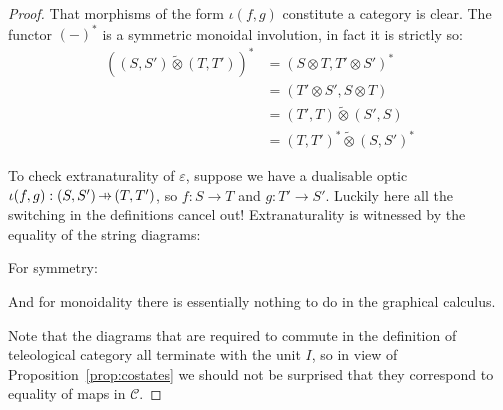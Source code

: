 \documentclass[11pt,letterpaper]{article}
\theoremstyle{plain}
\theoremstyle{definition}
\newcommand{\C}{\mathscr{C}}
\newcommand{\switched}{\mathbin{\tilde{\otimes}}}
\newcommand{\hto}{\ensuremath{\,\mathaccent\shortmid\rightarrow\,}}
\newcommand{\todo}[1]{\textcolor{red}{\small #1}}
\begin{document}
\begin{proof}
  That morphisms of the form $\iota(f, g)$ constitute a category is clear. The functor ${(-)}^*$ is a symmetric monoidal involution, in fact it is strictly so:
  \begin{align*}
    {\left( (S, S') \switched (T, T') \right)}^*
    &= {\left( S \otimes T, T' \otimes S' \right)}^* \\
    &= {\left(T' \otimes S', S \otimes T  \right)} \\
    &= (T', T) \switched (S', S) \\
    &= {(T, T')}^* \switched {(S, S')}^*
  \end{align*}

  To check extranaturality of $\varepsilon$, suppose we have a dualisable optic $\iota(f, g) : (S, S') \hto (T, T')$, so $f : S \to T$ and $g : T' \to S'$. Luckily here all the switching in the definitions cancel out! Extranaturality is witnessed by the equality of the string diagrams:
  \begin{center}
    
    \qquad \raisebox{1.5cm}{$=$} \qquad
    
  \end{center}
  For symmetry:
  \begin{center}
    
    \qquad \raisebox{1.5cm}{$=$} \qquad
    
  \end{center}
  And for monoidality there is essentially nothing to do in the graphical calculus.
  \begin{center}
    
    \qquad \raisebox{2cm}{$=$} \qquad
    
  \end{center}

  Note that the diagrams that are required to commute in the definition of teleological category all terminate with the unit $I$, so in view of Proposition~\ref{prop:costates} we should not be surprised that they correspond to equality of maps in $\C$.
\end{proof}

\end{document}
